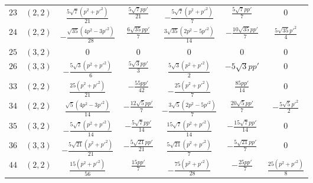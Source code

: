 \documentclass[aps,prl,showpacs,amsmath,onecolumn,superscriptaddress,floatfix,nofootinbib,notitlepage]{revtex4-2}
\begin{document}
\begin{table}[t]
\begin{tabular}{cc|ccccc}
		$23$                  & $(2,2)$             & $\frac{5 \sqrt{7} (p^{2} + p'^{2})}{21}$       & $\frac{5 \sqrt{7} p p'}{21}$    & $- \frac{5 \sqrt{7} (p^{2} + p'^{2})}{7}$      & $\frac{5 \sqrt{7} p p'}{7}$     & $0$                              \\
		$24$                  & $(2,2)$             & $- \frac{\sqrt{35} (4 p^{2} - 3 p'^{2})}{28}$  & $\frac{6 \sqrt{35} p p'}{7}$    & $\frac{3 \sqrt{35} (2 p^{2} - 5 p'^{2})}{14}$  & $- \frac{10 \sqrt{35} p p'}{7}$ & $\frac{5 \sqrt{35} p'^{2}}{4}$   \\
		$25$                  & $(3,2)$             & $0$                                            & $0$                             & $0$                                            & $0$                             & $0$                              \\
		$26$                  & $(3,3)$             & $- \frac{5 \sqrt{3} (p^{2} + p'^{2})}{6}$      & $\frac{5 \sqrt{3} p p'}{3}$     & $\frac{5 \sqrt{3} (p^{2} + p'^{2})}{2}$        & $- 5 \sqrt{3} p p'$             & $0$                              \\
		$33$                  & $(2,2)$             & $\frac{25 (p^{2} + p'^{2})}{21}$               & $- \frac{55 p p'}{42}$          & $- \frac{25 (p^{2} + p'^{2})}{7}$              & $\frac{85 p p'}{14}$            & $0$                              \\
		$34$                  & $(2,2)$             & $\frac{\sqrt{5} (4 p^{2} - 3 p'^{2})}{14}$     & $- \frac{12 \sqrt{5} p p'}{7}$  & $- \frac{3 \sqrt{5} (2 p^{2} - 5 p'^{2})}{7}$  & $\frac{20 \sqrt{5} p p'}{7}$    & $- \frac{5 \sqrt{5} p'^{2}}{2}$  \\
		$35$                  & $(3,2)$             & $- \frac{5 \sqrt{7} (p^{2} + p'^{2})}{14}$     & $- \frac{5 \sqrt{7} p p'}{14}$  & $\frac{15 \sqrt{7} (p^{2} + p'^{2})}{14}$      & $- \frac{15 \sqrt{7} p p'}{14}$ & $0$                              \\
		$36$                  & $(3,3)$             & $- \frac{5 \sqrt{21} (p^{2} + p'^{2})}{21}$    & $- \frac{5 \sqrt{21} p p'}{21}$ & $\frac{5 \sqrt{21} (p^{2} + p'^{2})}{7}$       & $- \frac{5 \sqrt{21} p p'}{7}$  & $0$                              \\
		$44$                  & $(2,2)$             & $\frac{15 (p^{2} + p'^{2})}{56}$               & $\frac{15 p p'}{7}$             & $- \frac{75 (p^{2} + p'^{2})}{28}$             & $- \frac{25 p p'}{7}$           & $\frac{25 (p^{2} + p'^{2})}{8}$  \\

\end{tabular}
\end{table}
\end{document}

